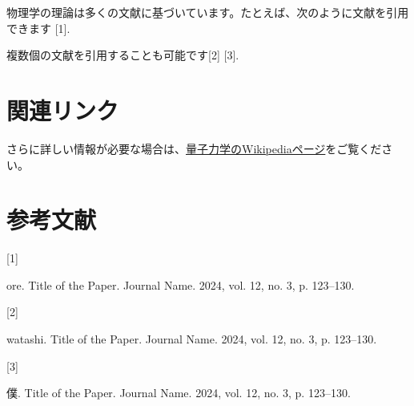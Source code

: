 \documentclass[
  11pt,
  a4paper]{ltjsarticle}
\newlength{\cslhangindent}
\newlength{\csllabelwidth}
\newenvironment{CSLReferences}[2] %
 {\begin{list}{}{%
  \setlength{\itemindent}{0pt}
  \setlength{\leftmargin}{0pt}
  \setlength{\parsep}{0pt}
  \ifodd #1
   \setlength{\leftmargin}{\cslhangindent}
   \setlength{\itemindent}{-1\cslhangindent}
  \fi
  \setlength{\itemsep}{#2\baselineskip}}}
 {\end{list}}
\newcommand{\CSLLeftMargin}[1]{\parbox[t]{\csllabelwidth}{\strut#1\strut}}
\newcommand{\CSLRightInline}[1]{\parbox[t]{\linewidth - \csllabelwidth}{\strut#1\strut}}
\begin{document}
物理学の理論は多くの文献に基づいています。たとえば、次のように文献を引用できます
{[}1{]}.

複数個の文献を引用することも可能です{[}2{]} {[}3{]}.

\section{関連リンク}\label{ux95a2ux9023ux30eaux30f3ux30af}

さらに詳しい情報が必要な場合は、\href{https://en.wikipedia.org/wiki/Quantum_mechanics}{量子力学のWikipediaページ}をご覧ください。

\section*{参考文献}\label{ux53c2ux8003ux6587ux732e}

\label{refs}
\begin{CSLReferences}{0}{0}
\CSLLeftMargin{{[}1{]} }%
\CSLRightInline{ore. Title of the Paper. Journal Name. 2024, vol. 12,
no. 3, p. 123--130.}

\CSLLeftMargin{{[}2{]} }%
\CSLRightInline{watashi. Title of the Paper. Journal Name. 2024, vol.
12, no. 3, p. 123--130.}

\CSLLeftMargin{{[}3{]} }%
\CSLRightInline{僕. Title of the Paper. Journal Name. 2024, vol. 12, no.
3, p. 123--130.}

\end{CSLReferences}
\end{document}
